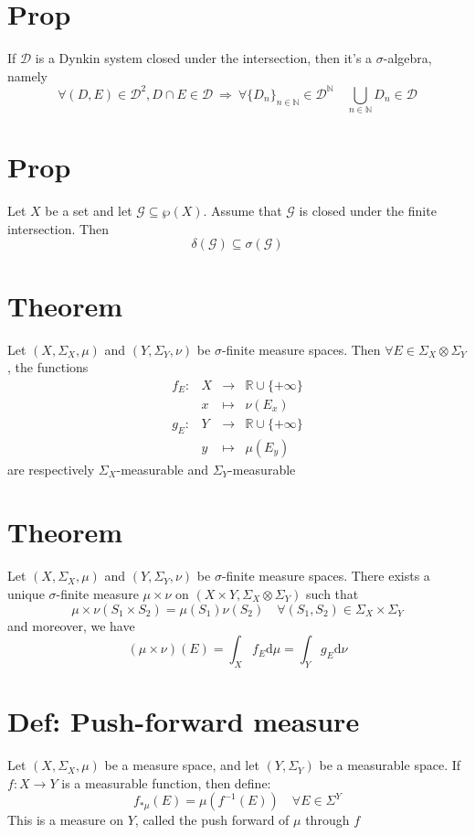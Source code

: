 \documentclass{article}
\begin{document}
\section{Prop}
If $\mathscr{D}$ is a Dynkin system closed under the intersection, then it's a $\sigma$-algebra, namely
$$\forall(D,E)\in \mathscr{D}^2, D\cap E\in \mathscr{D}\ \Rightarrow\ \forall\{D_n\}_{n\in \mathbb{N}}\in \mathscr{D}^\mathbb{N}\quad \bigcup\limits_{n\in \mathbb{N}}D_n\in \mathscr{D}$$
\section{Prop}
\label{Prop 53.7}
Let $X$ be a set and let $\mathcal{G}\subseteq\wp(X)$. Assume that $\mathcal{G}$ is closed under the finite intersection. Then $$\delta(\mathcal{G})\subseteq\sigma(\mathcal{G})$$
\section{Theorem}
Let $(X,\Sigma_X,\mu)$ and $(Y,\Sigma_Y,\nu)$ be $\sigma$-finite measure spaces. Then $\forall E\in \Sigma_X\otimes\Sigma_Y$, the functions
$$\begin{aligned}
    f_E: &X &\rightarrow &\mathbb{R}\cup\{+\infty\}\\ &x &\mapsto &\nu(E_x)\\
    g_E: &Y &\rightarrow &\mathbb{R}\cup\{+\infty\}\\ &y &\mapsto &\mu(E_y)
\end{aligned}$$
are respectively $\Sigma_X$-measurable and $\Sigma_Y$-measurable
\section{Theorem}
Let $(X,\Sigma_X,\mu)$ and $(Y,\Sigma_Y,\nu)$ be $\sigma$-finite measure spaces. There exists a unique $\sigma$-finite measure $\mu\times\nu$ on $(X\times Y,\Sigma_X\otimes\Sigma_Y)$ such that
$$\mu\times\nu(S_1\times S_2)=\mu(S_1)\nu(S_2)\quad \forall(S_1,S_2)\in\Sigma_X\times \Sigma_Y$$
and moreover, we have 
$$(\mu\times\nu)(E)=\int_Xf_E\text{d}\mu=\int_Yg_E\text{d}\nu$$
\section{Def: Push-forward measure}
Let $(X,\Sigma_X,\mu)$ be a measure space, and let $(Y,\Sigma_Y)$ be a measurable space. If $f:X\rightarrow Y$ is a measurable function, then define:
$$f_{*\mu}(E)=\mu(f^{-1}(E))\quad \forall E\in \Sigma^Y$$
This is a measure on $Y$, called the push forward of $\mu$ through $f$
\end{document}
